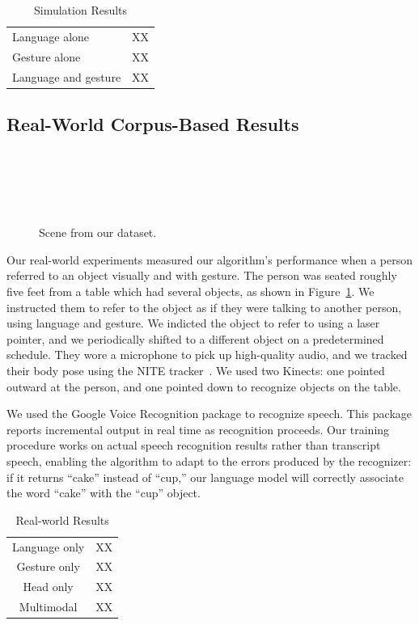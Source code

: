 \documentclass[letterpaper, 10 pt, conference]{ieeeconf}
\begin{document}
\begin{table}
\caption{Simulation Results\label{table:sim_results}}
\begin{tabular}{lr}
Language alone &  XX\\
Gesture alone & XX\\
Language and gesture &  XX
\end{tabular}

\end{table}

\subsection{Real-World Corpus-Based Results}

\begin{figure}
\parbox{1\linewidth}{~\\~\\~\\~\\}
\caption{Scene from our dataset.\label{fig:corpus_scene}}
\end{figure}

Our real-world experiments measured our algorithm's performance when a
person referred to an object visually and with gesture.  The person
was seated roughly five feet from a table which had several objects,
as shown in Figure~\ref{fig:corpus_scene}.  We instructed them to
refer to the object as if they were talking to another person, using
language and gesture.  We indicted the object to refer to using a
laser pointer, and we periodically shifted to a different object on a
predetermined schedule.  They wore a microphone to pick up
high-quality audio, and we tracked their body pose using the NITE
tracker~\citep{openni}.  We used two Kinects: one pointed outward at the
person, and one pointed down to recognize objects on the table.

We used the Google Voice Recognition package to recognize speech.
This package reports incremental output in real time as recognition
proceeds.  Our training procedure works on actual speech recognition
results rather than transcript speech, enabling the algorithm to adapt
to the errors produced by the recognizer: if it returns ``cake''
instead of ``cup,'' our language model will correctly associate the
word ``cake'' with the ``cup'' object.

\begin{table}
\caption{Real-world Results}
\begin{tabular}{cc}
Language only &  XX\\
Gesture only  &  XX\\
Head only     &  XX\\
Multimodal    &  XX\\
\end{tabular}
\end{table}
\end{document}
